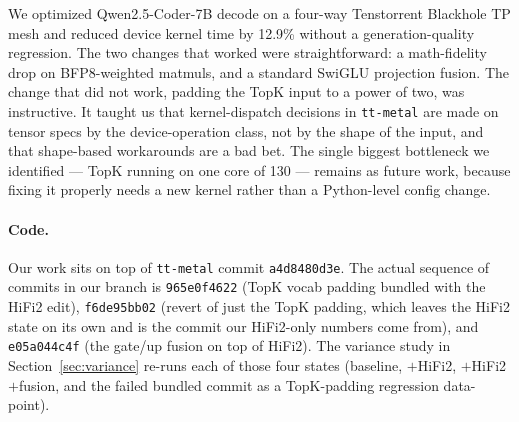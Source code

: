 \documentclass[sigplan,nonacm]{acmart}
\begin{document}
We optimized Qwen2.5-Coder-7B decode on a four-way Tenstorrent
Blackhole TP mesh and reduced device kernel time by 12.9\% without
a generation-quality regression. The two changes that worked were
straightforward: a math-fidelity drop on BFP8-weighted matmuls, and
a standard SwiGLU projection fusion. The change that did not work,
padding the TopK input to a power of two, was instructive. It taught
us that kernel-dispatch decisions in \texttt{tt-metal} are made on
tensor specs by the device-operation class, not by the shape of the
input, and that shape-based workarounds are a bad bet. The single
biggest bottleneck we identified --- TopK running on one core of 130
--- remains as future work, because fixing it properly needs a new
kernel rather than a Python-level config change.

\paragraph{Code.} Our work sits on top of \texttt{tt-metal} commit
\texttt{a4d8480d3e}. The actual sequence of commits in our branch is
\texttt{965e0f4622} (TopK vocab padding bundled with the HiFi2 edit),
\texttt{f6de95bb02} (revert of just the TopK padding, which leaves
the HiFi2 state on its own and is the commit our HiFi2-only numbers
come from), and \texttt{e05a044c4f} (the gate/up fusion on top of
HiFi2). The variance study in Section~\ref{sec:variance} re-runs
each of those four states (baseline, $+$HiFi2, $+$HiFi2$+$fusion,
and the failed bundled commit as a TopK-padding regression
data-point).

\balance


\end{document}
